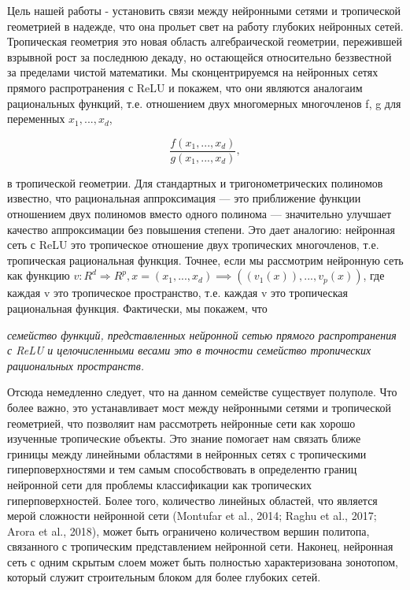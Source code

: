 \documentclass[russian]{lecture-notes}
\begin{document}
	Цель нашей работы - установить связи между нейронными сетями и тропической геометрией в надежде, что она прольет свет на работу глубоких нейронных сетей. Тропическая геометрия это новая область алгебраической геометрии, пережившей взрывной рост за последнюю декаду, но остающейся относительно беззвестной за пределами чистой математики. Мы сконцентрируемся на нейронных сетях прямого распротранения с ReLU и покажем, что они являются аналогаим рациональных функций, т.е. отношением двух многомерных многочленов f, g для переменных $x_1,...,x_d$,
	
	\begin{equation*}
	\frac{f(x_1,...,x_d)}{g(x_1,...,x_d)},
	\end{equation*}
	
	в тропической геометрии. Для стандартных и тригонометрических полиномов известно, что рациональная аппроксимация --- это приближение функции отношением двух полиномов вместо одного полинома --- значительно улучшает качество аппроксимации без повышения степени. Это дает аналогию: нейронная сеть с ReLU это тропическое отношение двух тропических многочленов, т.е. тропическая рациональная функция. Точнее, если мы рассмотрим нейронную сеть как функцию $v : R^d \Rightarrow R^p, x=(x_1,...,x_d) \implies ((v_1(x)),...,v_p(x))$, где каждая v это тропическое пространство, т.е. каждая v это тропическая рациональная функция. Фактически, мы покажем, что
	
	
	\textit{семейство функций, представленных нейронной сетью прямого распротранения с ReLU и целочисленными весами это в точности семейство тропических рациональных пространств.}
	
	Отсюда немедленно следует, что на данном семействе существует полуполе. Что более важно, это устанавливает мост между нейронными сетями и тропической геометрией, что позволяит нам рассмотреть нейронные сети как хорошо изученные тропические объекты. Это знание помогает нам связать ближе гриницы между линейными областями в нейронных сетях с тропическими гиперповерхностями и тем самым способствовать в определентю границ нейронной сети для проблемы классификации как тропических гиперповерхностей. Более того, количество линейных областей, что является мерой сложности нейронной сети (Montufar et al., 2014; Raghu et al., 2017; Arora
	et al., 2018), может быть ограничено количеством вершин политопа, связанного с тропическим представлением нейронной сети. Наконец, нейронная сеть с одним скрытым слоем может быть полностью характеризована зонотопом, который служит строительным блоком для более глубоких сетей.
	
\end{document}
